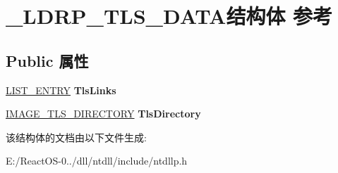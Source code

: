 \hypertarget{struct___l_d_r_p___t_l_s___d_a_t_a}{}\section{\+\_\+\+L\+D\+R\+P\+\_\+\+T\+L\+S\+\_\+\+D\+A\+T\+A结构体 参考}
\label{struct___l_d_r_p___t_l_s___d_a_t_a}
\subsection*{Public 属性}
\begin{DoxyCompactItemize}
\item 
\mbox{\label{struct___l_d_r_p___t_l_s___d_a_t_a_ab74ad1ec740952568690058f73f453bc}} 
\hyperlink{struct___l_i_s_t___e_n_t_r_y}{L\+I\+S\+T\+\_\+\+E\+N\+T\+RY} {\bfseries Tls\+Links}
\item 
\mbox{\label{struct___l_d_r_p___t_l_s___d_a_t_a_a18c893b1b386461dbec625ccb759a274}} 
\hyperlink{struct___i_m_a_g_e___t_l_s___d_i_r_e_c_t_o_r_y32}{I\+M\+A\+G\+E\+\_\+\+T\+L\+S\+\_\+\+D\+I\+R\+E\+C\+T\+O\+RY} {\bfseries Tls\+Directory}
\end{DoxyCompactItemize}


该结构体的文档由以下文件生成\+:\begin{DoxyCompactItemize}
\item 
E\+:/\+React\+O\+S-\/0../dll/ntdll/include/ntdllp.\+h\end{DoxyCompactItemize}

